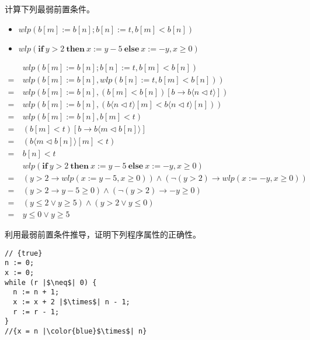 \documentclass[11pt,a4paper]{article}
\begin{document}
\subproblem 计算下列最弱前置条件。
\begin{itemize}
    \item $wlp(b[m]:=b[n];b[n]:=t, b[m] < b[n])$
    \item $wlp(\textbf{if}\ y > 2\ \textbf{then}\ x:= y - 5\ \textbf{else}\ x:= -y, x \ge 0)$
\end{itemize}
\begin{solution}
    \begin{align*}
	    &wlp(b[m]:=b[n];b[n]:=t, b[m] < b[n]) \\
	    =\ &wlp(b[m]:=b[n],wlp(b[n]:=t,b[m]<b[n])) \\
	    =\ &wlp(b[m]:=b[n],(b[m]<b[n])[b\rightarrow b\langle{n\triangleleft t}\rangle]) \\
	    =\ &wlp(b[m]:=b[n],(b\langle{n\triangleleft t}\rangle[m]<b\langle{n\triangleleft t}\rangle[n])) \\
	    =\ &wlp(b[m]:=b[n],b[m]<t) \\
	    =\ &(b[m]<t)[b\rightarrow b\langle{m\triangleleft b[n]}\rangle] \\
	    =\ &(b\langle{m\triangleleft b[n]}\rangle[m]<t) \\
	    =\ &b[n]<t \\
    	&wlp(\textbf{if}\ y > 2\ \textbf{then}\ x:= y - 5\ \textbf{else}\ x:= -y, x \ge 0) \\
	   	=\ &(y>2\rightarrow wlp(x:=y-5,x\geq 0))\land(\neg(y>2)\rightarrow wlp(x:=-y,x\geq 0)) \\
	   	=\ &(y>2\rightarrow y-5\geq 0)\land(\neg(y>2)\rightarrow -y\geq 0) \\
	   	=\ &(y\leq 2 \lor y\geq 5)\land(y>2\lor y\leq 0) \\
	   	=\ &y\leq 0\lor y\geq 5
    \end{align*}
\end{solution}

\subproblem 利用最弱前置条件推导，证明下列程序属性的正确性。
\begin{lstlisting}
// {true}
n := 0;
x := 0;
while (r |$\neq$| 0) {
  n := n + 1;
  x := x + 2 |$\times$| n - 1;
  r := r - 1;
}
//{x = n |\color{blue}$\times$| n}
\end{lstlisting}
\end{document}
